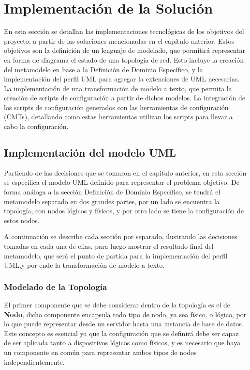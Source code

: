 \chapter{Implementación de la Solución} \label{Implementacion de Solucion}

En esta sección se detallan las implementaciones tecnológicas de los objetivos del proyecto, a partir de las soluciones mencionadas en el capítulo anterior.
Estos objetivos son la definición de un lenguaje de modelado, que permitirá representar en forma de diagrama el estado de una topología de red. Esto incluye la creación del metamodelo en base a la Definición de Dominio Específico, y la implementación del perfil UML para agregar la extensiones de UML necesarias. 
La implementación de una transformación de modelo a texto, que permita la creación de scripts de configuración a partir de dichos modelos.
La integración de los scripts de configuración generados con las herramientas de configuración (CMTs), detallando como estas herramientas utilizan los scripts para llevar a cabo la configuración. 

\section{Implementación del modelo UML}
Partiendo de las decisiones que se tomaron en el capitulo anterior, en esta sección se especifica el modelo UML definido para representar el problema objetivo. De forma análoga a la sección Definición de Dominio Específico, se tendrá el metamodelo separado en dos grandes partes, por un lado se encuentra la topología, con nodos lógicos y físicos, y por otro lado se tiene la configuración de estos nodos.

A continuación se describe cada sección por separado, ilustrando las decisiones tomadas en cada una de ellas, para luego mostrar el resultado final del metamodelo, que será el punto de partida para la implementación del perfil UML,y por ende la transformación de modelo a texto.

\subsection{Modelado de la Topología}
El primer componente que se debe considerar dentro de la topología es el de \textbf{Nodo}, dicho componente encapsula todo tipo de nodo, ya sea físico, o lógico, por lo que puede representar desde un servidor hasta una instancia de base de datos. 
Este concepto es esencial ya que la configuración que se definirá debe ser capaz de ser aplicada tanto a dispositivos lógicos como físicos, y es necesario que haya un componente en común para representar ambos tipos de nodos independientemente.

